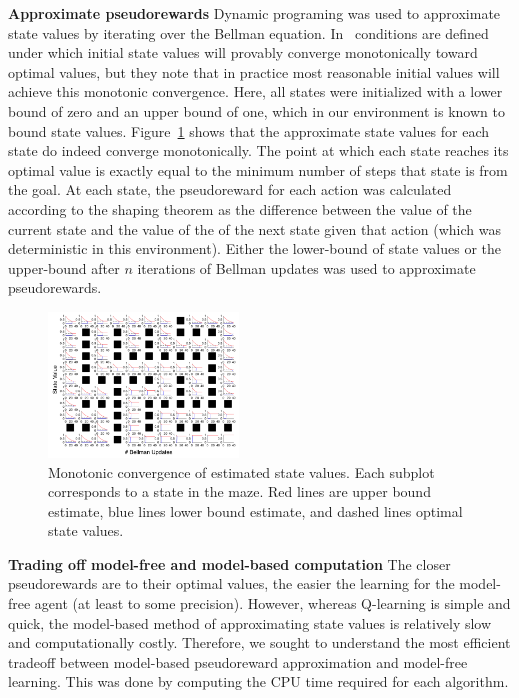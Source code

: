 \documentclass[letterpaper]{article}
\begin{document}
\noindent
\textbf{Approximate pseudorewards} Dynamic programing was used to approximate state values by iterating over the Bellman equation. In~\cite{mcmahan2005bounded} conditions are defined under which initial state values will provably converge monotonically toward optimal values, but they note that in practice most reasonable initial values will achieve this monotonic convergence. Here, all states were initialized with a lower bound of zero and an upper bound of one, which in our environment is known to bound state values. Figure~\ref{fig:value_bounds} shows that the approximate state values for each state do indeed converge monotonically. The point at which each state reaches its optimal value is exactly equal to the minimum number of steps that state is from the goal. At each state, the pseudoreward for each action was calculated according to the shaping theorem as the difference between the value of the current state and the value of the of the next state given that action (which was deterministic in this environment). Either the lower-bound of state values or the upper-bound after $n$ iterations of Bellman updates was used to approximate pseudorewards.

\begin{figure}[ht]
\centering
\includegraphics[width=0.45\textwidth]{value_bounds_labeled}
\caption{Monotonic convergence of estimated state values. Each subplot corresponds to a state in the maze. Red lines are upper bound estimate, blue lines lower bound estimate, and dashed lines optimal state values.}
\label{fig:value_bounds}
\end{figure}



\noindent
\textbf{Trading off model-free and model-based computation} The closer pseudorewards are to their optimal values, the easier the learning for the model-free agent (at least to some precision). However, whereas Q-learning is simple and quick, the model-based method of approximating state values is relatively slow and computationally costly. Therefore, we sought to understand the most efficient tradeoff between model-based pseudoreward approximation and model-free learning. This was done by computing the CPU time required for each algorithm.
\end{document}
